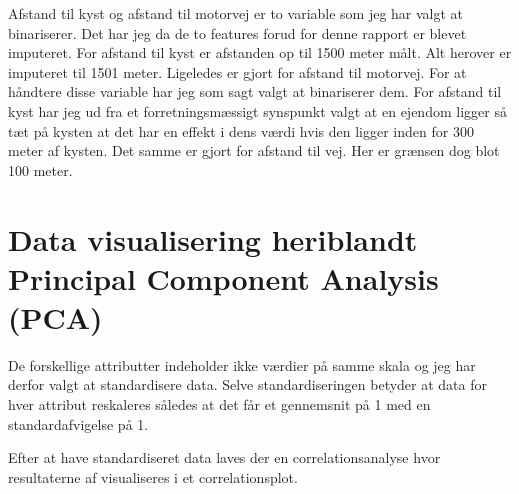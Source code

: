 \documentclass{report}
\begin{document}
Afstand til kyst og afstand til motorvej er to variable som jeg har valgt at binariserer. Det har jeg da de to
features forud for denne rapport er blevet imputeret. For afstand til kyst er afstanden op til 1500 meter målt.
Alt herover er imputeret til 1501 meter. Ligeledes er gjort for afstand til motorvej.
For at håndtere disse variable har jeg som sagt valgt at binariserer dem. For afstand til kyst har jeg ud fra et
forretningsmæssigt synspunkt valgt at en ejendom ligger så tæt på kysten at det har en effekt i dens værdi hvis
den ligger inden for 300 meter af kysten. Det samme er gjort for afstand til vej. Her er grænsen dog blot 100
meter.



\section{Data visualisering heriblandt Principal Component Analysis (PCA)}

De forskellige attributter indeholder ikke værdier på samme skala og jeg har derfor valgt at standardisere data.
Selve standardiseringen betyder at data for hver attribut reskaleres således at det får et gennemsnit på 1 med en
standardafvigelse på 1.

% 
Efter at have standardiseret data laves der en correlationsanalyse hvor resultaterne af visualiseres i et correlationsplot.
\end{document}
